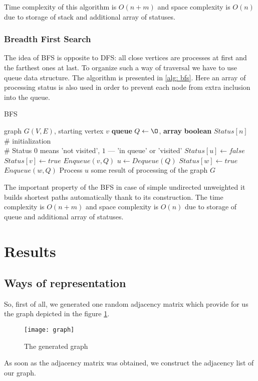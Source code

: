 \documentclass[12pt, bachelor, substylefile = algo_title.rtx]{disser}
\theoremstyle{definition}
\begin{document}
Time complexity of this algorithm is $O(n+m)$ and space complexity is $O(n)$ due to storage of stack and additional array of statuses.

\subsubsection{Breadth First Search}
The idea of BFS is opposite to DFS: all close vertices are processes at first and the farthest ones at last. To organize such a way of traversal we have to use queue data structure. The algorithm is presented in \ref{alg: bfs}. Here an array of processing status is also used in order to prevent each node from extra inclusion into the queue. 
\begin{algorithm}[!h]
\caption{BFS}
\label{alg: bfs}
\begin{algorithmic}

\Require graph $G(V, E)$, starting vertex $v$
\State \textbf{queue} $Q \gets \O$, \textbf{array} \textbf{boolean} $Status[n]$\\
\# initialization\\
\# Status $0$ means 'not visited', $1$ --- 'in queue' or 'visited'
	\State $Status[u] \gets false$
\EndFor
\State $Status[v] \gets true$
\State $Enqueue(v, Q)$
	\State $u \gets Dequeue(Q)$
				\State $Status[w] \gets true$
				\State $Enqueue(w, Q)$
			\EndIf
		\EndFor
	\State Process $u$
\EndWhile
\Ensure some result of processing of the graph $G$
\end{algorithmic}
\end{algorithm}

The important property of the BFS in case of simple undirected unweighted it builds shortest paths automatically thank to its construction. The time complexity is $O(n+m)$ and space complexity is $O(n)$ due to storage of queue and additional array of statuses.

\section{Results}
\subsection{Ways of representation}
So, first of all, we generated one random adjacency matrix which provide for us the graph depicted in the figure \ref{fig: 1}.
\begin{figure}[!h]
\begin{center}
\texttt{[image: graph]}
\caption{The generated graph}
\label{fig: 1}
\end{center}
\end{figure}
As soon as the adjacency matrix was obtained, we construct the adjacency list of our graph. 
\end{document}
